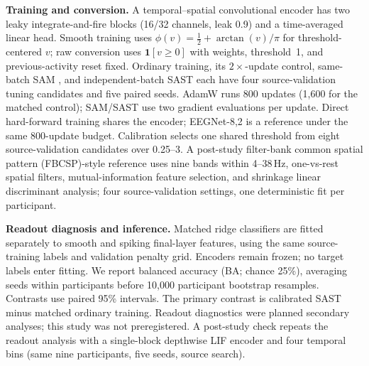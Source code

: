 \textbf{Training and conversion.}
A temporal--spatial convolutional encoder has two leaky integrate-and-fire
blocks (16/32 channels, leak 0.9) and a time-averaged linear head. Smooth
training uses $\phi(v)=\tfrac12+\arctan(v)/\pi$ for threshold-centered $v$;
raw conversion uses $\mathbf{1}[v\geq0]$ with weights, threshold~1, and
previous-activity reset fixed. Ordinary training, its $2\times$-update control,
same-batch SAM \citep{foret}, and independent-batch SAST each have four
source-validation tuning candidates and five paired seeds. AdamW runs
800 updates (1,600 for the matched control); SAM/SAST use two gradient
evaluations per update. Direct hard-forward training shares the encoder;
EEGNet-8,2 \citep{lawhern} is a reference under the same 800-update budget. Calibration selects
one shared threshold from eight source-validation candidates over 0.25--3.
A post-study filter-bank common spatial pattern (FBCSP)-style reference
\citep{ang} uses nine bands within 4--38\,Hz, one-vs-rest spatial filters,
mutual-information feature selection, and shrinkage linear discriminant analysis;
four source-validation settings, one deterministic fit per participant.

\textbf{Readout diagnosis and inference.}
Matched ridge classifiers are fitted separately to smooth and spiking
final-layer features, using the same source-training labels and validation
penalty grid. Encoders remain frozen; no target labels enter fitting.
We report balanced accuracy (BA; chance 25\%), averaging seeds within
participants before 10,000 participant bootstrap resamples. Contrasts use
paired 95\% intervals. The primary contrast is calibrated SAST minus
matched ordinary training. Readout diagnostics were planned secondary
analyses; this study was not preregistered.
A post-study check repeats the readout analysis with a single-block depthwise LIF
encoder and four temporal bins (same nine participants, five seeds, source search).

